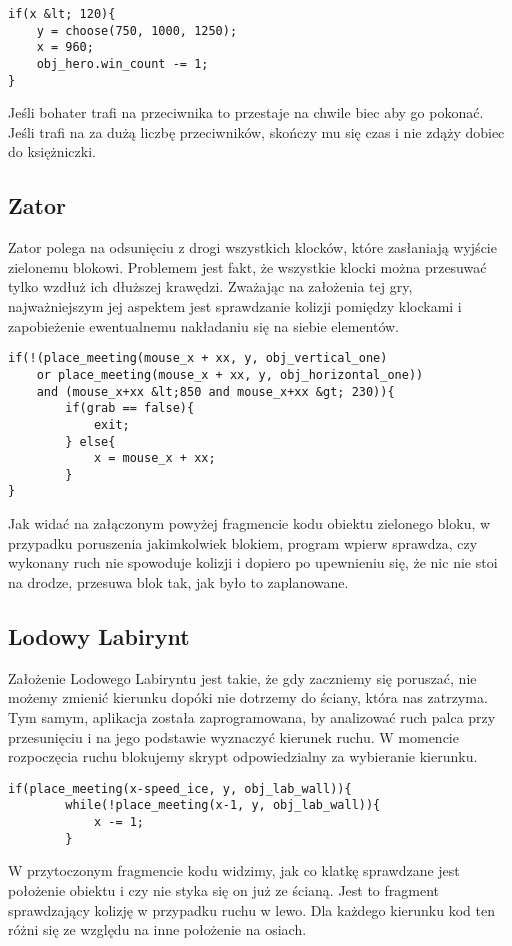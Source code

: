 \documentclass[openright]{xmgr}
\begin{document}
\begin{lstlisting}[caption={Fragment kodu obiektu obj\_orc}]
if(x &lt; 120){
    y = choose(750, 1000, 1250);
    x = 960;
    obj_hero.win_count -= 1;
}
\end{lstlisting}
Jeśli bohater trafi na przeciwnika to przestaje na chwile biec aby go
pokonać. Jeśli trafi na za dużą liczbę przeciwników, skończy mu się czas i
nie zdąży dobiec do księżniczki.

\subsection{Zator}
Zator polega na odsunięciu z drogi wszystkich klocków, które zasłaniają wyjście zielonemu blokowi. Problemem jest fakt, że wszystkie klocki można przesuwać tylko wzdłuż ich dłuższej krawędzi. Zważając na założenia tej gry, najważniejszym jej aspektem jest sprawdzanie kolizji pomiędzy klockami i zapobieżenie ewentualnemu nakładaniu się na siebie elementów. 

\begin{lstlisting}[caption={Fragment kodu obiektu obj\_green\_one}]
if(!(place_meeting(mouse_x + xx, y, obj_vertical_one)
    or place_meeting(mouse_x + xx, y, obj_horizontal_one)) 
    and (mouse_x+xx &lt;850 and mouse_x+xx &gt; 230)){
        if(grab == false){
            exit;
        } else{
            x = mouse_x + xx;
        }    
}
\end{lstlisting}

Jak widać na załączonym powyżej fragmencie kodu obiektu zielonego bloku, w
przypadku poruszenia jakimkolwiek blokiem, program wpierw sprawdza, czy wykonany ruch nie spowoduje kolizji i dopiero po upewnieniu się, że nic nie stoi na drodze, przesuwa blok tak, jak było to zaplanowane.


\subsection{Lodowy Labirynt}
Założenie Lodowego Labiryntu jest takie, że gdy zaczniemy się poruszać, nie możemy zmienić kierunku dopóki nie dotrzemy do ściany, która nas zatrzyma. Tym samym, aplikacja została zaprogramowana, by analizować ruch palca przy przesunięciu i na jego podstawie wyznaczyć kierunek ruchu. W momencie rozpoczęcia ruchu blokujemy skrypt odpowiedzialny za wybieranie kierunku.

\begin{lstlisting}[caption={Fragment kodu obiektu obj\_player\_ice}]
    if(place_meeting(x-speed_ice, y, obj_lab_wall)){
        while(!place_meeting(x-1, y, obj_lab_wall)){
            x -= 1;
        }
\end{lstlisting}
W przytoczonym fragmencie kodu widzimy, jak co klatkę sprawdzane jest położenie obiektu i czy nie styka się on już ze ścianą. Jest to fragment sprawdzający kolizję w przypadku ruchu w lewo. Dla każdego kierunku kod ten różni się ze względu na inne położenie na osiach.
\end{document}
